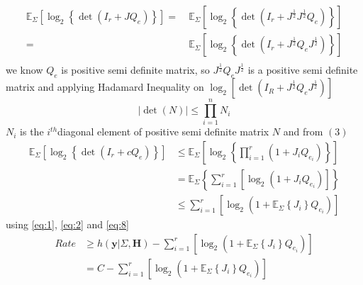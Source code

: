 \documentclass[conference]{IEEEtran}
\def\bH{\mathbf{H}}
\def\by{\mathbf{y}}
\begin{document}


\begin{equation*}
	\begin{split}
		\mathbb{E}_{\Sigma}\left[\log_{2} \left\{\det \left(I_r+JQ_e\right)\right\}\right] =\  & \mathbb{E}_{\Sigma}\left[\log_{2} \left\{\det \left(I_r+J^{\frac{1}{2}}J^{\frac{1}{2}}Q_e\right)\right\}\right]\\
		=& \mathbb{E}_{\Sigma}\left[\log_{2} \left\{\det \left(I_r+J^{\frac{1}{2}}Q_eJ^{\frac{1}{2}}\right)\right\}\right]\\
	\end{split}
\end{equation*}
we know $Q_e$ is positive semi definite matrix, so $J^{\frac{1}{2}}Q_eJ^{\frac{1}{2}}$ is a positive semi definite matrix and applying
Hadamard Inequality on $\log_{2}\left[\det\left(I_R+J^{\frac{1}{2}}Q_eJ^{\frac{1}{2}}\right)\right]$
\begin{equation*} \label{eq:7}
	|\det(N)| \leq \prod_{i=1}^{n} N_i
\end{equation*}
$N_i$ is the $i^{th}$diagonal element of positive semi definite matrix $N$ and
from $(3)$
\begin{equation} \label{eq:8}
	\begin{split}
		\mathbb{E}_{\Sigma}\left[\log_{2} \left\{\det \left(I_r+cQ_e\right)\right\}\right] & \leq
		\mathbb{E}_{\Sigma} \left[ \log_{2} \left\{ \prod_{i=1}^{r} \left( 1+J_i Q_{e_i} \right ) \right\} \right]\\
		& = \mathbb{E}_{\Sigma}\left\{ \sum_{i=1}^{r} \left[ \log_{2}\left( 1+J_i Q_{e_i} \right ) \right] \right\}\\
		& \leq  \sum_{i=1}^{r} \left[ \log_{2}\left( 1+\mathbb{E}_{\Sigma}\left\{J_i \right\} Q_{e_i} \right ) \right]
	\end{split}
\end{equation}
using \ref{eq:1}, \ref{eq:2} and \ref{eq:8}
\begin{equation*} \label{eq:9}
	\begin{split}
		Rate & \geq h(\by|\Sigma,\bH) - \sum_{i=1}^{r} \left[ \log_{2}\left( 1+\mathbb{E}_{\Sigma}\left\{J_i \right\} Q_{e_i} \right ) \right] \\
	    & = C - \sum_{i=1}^{r} \left[ \log_{2}\left( 1+\mathbb{E}_{\Sigma}\left\{J_i \right\}Q_{e_i} \right ) \right]
	\end{split}
\end{equation*}
\end{document}
